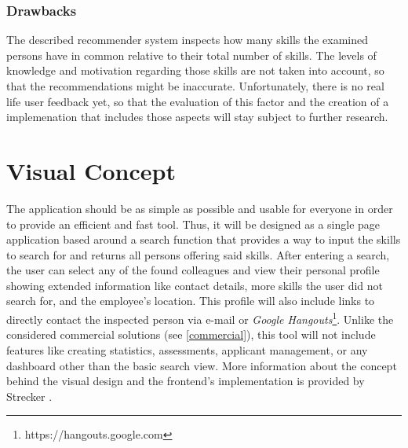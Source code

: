 \newpage

\subsubsection{Drawbacks}
The described recommender system inspects how many skills the examined persons have in common relative to their total number of skills. The levels of knowledge and motivation regarding those skills are not taken into account, so that the recommendations might be inaccurate. Unfortunately, there is no real life user feedback yet, so that the evaluation of this factor and the creation of a implemenation that includes those aspects will stay subject to further research.

\section{Visual Concept}
The application should be as simple as possible and usable for everyone in order to provide an efficient and fast tool. Thus, it will be designed as a single page application based around a search function that provides a way to input the skills to search for and returns all persons offering said skills. After entering a search, the user can select any of the found colleagues and view their personal profile showing extended information like contact details, more skills the user did not search for, and the employee's location. This profile will also include links to directly contact the inspected person via e-mail or \textit{Google Hangouts}\footnote{https://hangouts.google.com}. Unlike the considered commercial solutions (see \ref{commercial}), this tool will not include features like creating statistics, assessments, applicant management, or any dashboard other than the basic search view.
More information about the concept behind the visual design and the frontend's implementation is provided by Strecker \cite{strecker}.

